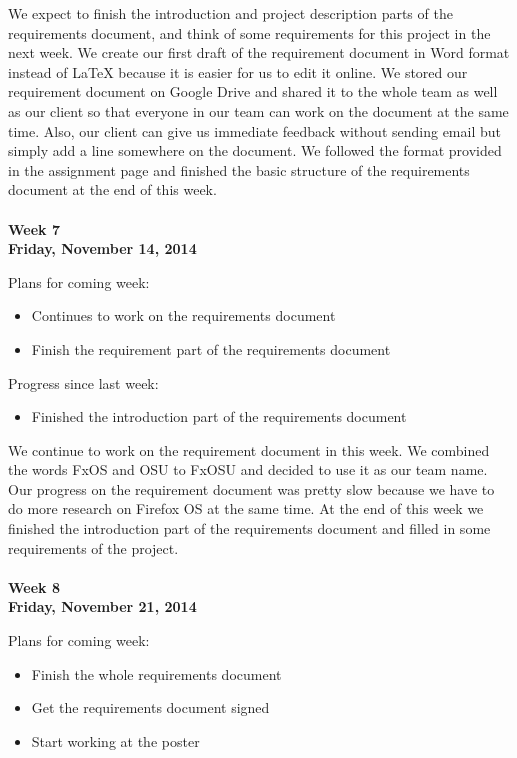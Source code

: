 \noindent We expect to finish the introduction and project description parts of the requirements document, and think of some requirements for this project in the next week. We create our first draft of the requirement document in Word format instead of LaTeX because it is easier for us to edit it online. We stored our requirement document on Google Drive and shared it to the whole team as well as our client so that everyone in our team can work on the document at the same time. Also, our client can give us immediate feedback without sending email but simply add a line somewhere on the document. We followed the format provided in the assignment page and finished the basic structure of the requirements document at the end of this week. \\
\\
\textbf{Week 7\\Friday, November 14, 2014\\}

\noindent Plans for coming week:
\begin{itemize}
\item Continues to work on the requirements document
\item Finish the requirement part of the requirements document
\end{itemize}

\noindent Progress since last week:
\begin{itemize}
\item Finished the introduction part of the requirements document
\end{itemize}

\noindent We continue to work on the requirement document in this week. We combined the words FxOS and OSU to FxOSU and decided to use it as our team name. Our progress on the requirement document was pretty slow because we have to do more research on Firefox OS at the same time. At the end of this week we finished the introduction part of the requirements document and filled in some requirements of the project. \\
\\
\textbf{Week 8\\Friday, November 21, 2014\\}

\noindent Plans for coming week:
\begin{itemize}
\item Finish the whole requirements document
\item Get the requirements document signed
\item Start working at the poster
\end{itemize}

